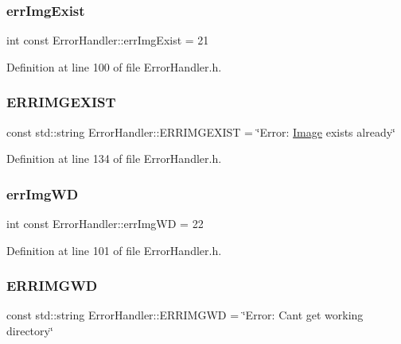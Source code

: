 \subsubsection{\texorpdfstring{errImgExist}{errImgExist}}
{\footnotesize\ttfamily int const Error\+Handler\+::err\+Img\+Exist = 21\hspace{0.3cm}{\ttfamily [static]}}



Definition at line 100 of file Error\+Handler.\+h.

\mbox{\label{classErrorHandler_a32d9d3b8749844fa07ce891edea63286}} 
\subsubsection{\texorpdfstring{ERRIMGEXIST}{ERRIMGEXIST}}
{\footnotesize\ttfamily const std\+::string Error\+Handler\+::\+E\+R\+R\+I\+M\+G\+E\+X\+I\+ST = \char`\"{}Error\+: \mbox{\hyperlink{classImage}{Image}} exists already\char`\"{}\hspace{0.3cm}{\ttfamily [static]}}



Definition at line 134 of file Error\+Handler.\+h.

\mbox{\label{classErrorHandler_afe6bbe690173284ff3f3adb889c036d8}} 
\subsubsection{\texorpdfstring{errImgWD}{errImgWD}}
{\footnotesize\ttfamily int const Error\+Handler\+::err\+Img\+WD = 22\hspace{0.3cm}{\ttfamily [static]}}



Definition at line 101 of file Error\+Handler.\+h.

\mbox{\label{classErrorHandler_adf275e9080935450d46748424c788efa}} 
\subsubsection{\texorpdfstring{ERRIMGWD}{ERRIMGWD}}
{\footnotesize\ttfamily const std\+::string Error\+Handler\+::\+E\+R\+R\+I\+M\+G\+WD = \char`\"{}Error\+: Can\textquotesingle{}t get working directory\char`\"{}\hspace{0.3cm}{\ttfamily [static]}}



